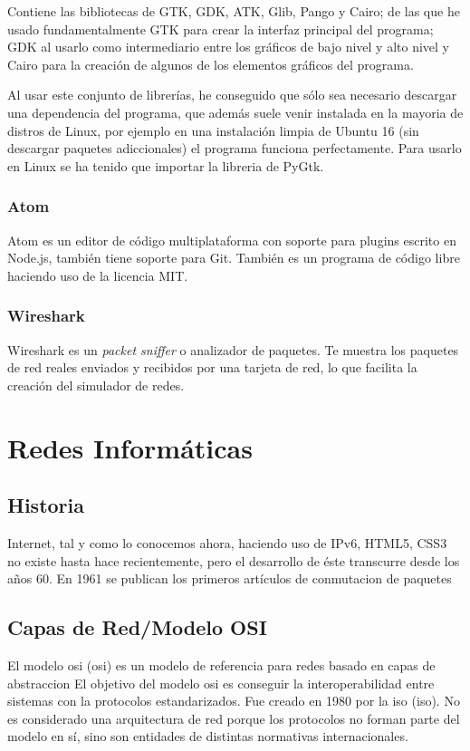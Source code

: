 \documentclass[a4paper, 11pt, twoside]{report} %
\newcommand{\acr}[1]{\acrshort{#1} (\acrlong{#1})}
\begin{document}
Contiene las bibliotecas de GTK, GDK, ATK, Glib, Pango y Cairo; de las que he usado fundamentalmente GTK para crear la interfaz principal del programa; GDK al usarlo como intermediario entre los gráficos de bajo nivel y alto nivel y Cairo para la creación de algunos de los elementos gráficos del programa.

Al usar este conjunto de librerías, he conseguido que sólo sea necesario descargar una dependencia del programa, que además suele venir instalada en la mayoria de distros de Linux, por ejemplo en una instalación limpia de Ubuntu 16 (sin descargar paquetes adiccionales) el programa funciona perfectamente. Para usarlo en Linux se ha tenido que importar la libreria de PyGtk.
\subsection{Atom}
Atom es un editor de código multiplataforma con soporte para plugins escrito en Node.js, también tiene soporte para Git. También es un programa de código libre haciendo uso de la licencia MIT.

\subsection{Wireshark}
Wireshark es un \textit{packet sniffer} o analizador de paquetes. Te muestra los paquetes de red reales enviados y recibidos por una tarjeta de red, lo que facilita la creación del simulador de redes.

\chapter{Redes Informáticas}
\section*{Historia}
Internet, tal y como lo conocemos ahora, haciendo uso de IPv6, HTML5, CSS3 no existe hasta hace recientemente, pero el desarrollo de éste transcurre desde los años 60. En 1961 se publican los primeros artículos de \gls{conmutacion de paquetes}
\section{Capas de Red/Modelo OSI}
El modelo \acr{osi} es un modelo de referencia para redes basado en \gls{capas de abstraccion}
El objetivo del modelo \gls{osi} es conseguir la interoperabilidad entre sistemas con la protocolos estandarizados. Fue creado en 1980 por la \acr{iso}. No es considerado una arquitectura de red porque los protocolos no forman parte del modelo en sí, sino son entidades de distintas normativas internacionales.
\vspace{1pt}
\end{document}
